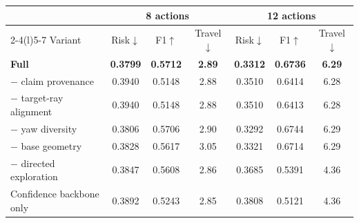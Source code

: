 \begin{tabular}{@{}lccc ccc@{}}
  \toprule
  & \multicolumn{3}{c}{8 actions} & \multicolumn{3}{c}{12 actions} \\
  \cmidrule(lr){2-4}\cmidrule(l){5-7}
  Variant & Risk$\downarrow$ & F1$\uparrow$ & Travel$\downarrow$ & Risk$\downarrow$ & F1$\uparrow$ & Travel$\downarrow$ \\
  \midrule
  \textbf{Full \method{}} & \textbf{0.3799} & \textbf{0.5712} & \textbf{2.89} & \textbf{0.3312} & \textbf{0.6736} & \textbf{6.29} \\
  $-$ claim provenance & 0.3940 & 0.5148 & 2.88 & 0.3510 & 0.6414 & 6.28 \\
  $-$ target-ray alignment & 0.3940 & 0.5148 & 2.88 & 0.3510 & 0.6413 & 6.28 \\
  $-$ yaw diversity & 0.3806 & 0.5706 & 2.90 & 0.3292 & 0.6744 & 6.29 \\
  $-$ base geometry & 0.3828 & 0.5617 & 3.05 & 0.3321 & 0.6714 & 6.29 \\
  $-$ directed exploration & 0.3847 & 0.5608 & 2.86 & 0.3685 & 0.5391 & 4.36 \\
  Confidence backbone only & 0.3892 & 0.5243 & 2.85 & 0.3808 & 0.5121 & 4.36 \\
  \bottomrule
\end{tabular}
